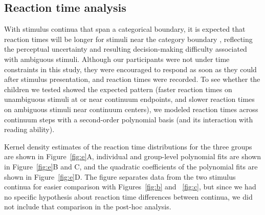 \documentclass[../uwthesis.tex]{subfiles}
\begin{document}
\subsection{Reaction time analysis}
With stimulus continua that span a categorical boundary, it is expected that reaction times will be longer for stimuli near the category boundary \cite{Pisoni1974ReactionCategories,Repp1981PerceptualStimuli}, reflecting the perceptual uncertainty and resulting decision-making difficulty associated with ambiguous stimuli. Although our participants were not under time constraints in this study, they were encouraged to respond as soon as they could after stimulus presentation, and reaction times were recorded. To see whether the children we tested showed the expected pattern (faster reaction times on unambiguous stimuli at or near continuum endpoints, and slower reaction times on ambiguous stimuli near continuum centers), we modeled reaction times across continuum steps with a second-order polynomial basis (and its interaction with reading ability).

Kernel density estimates of the reaction time distributions for the three groups are shown in Figure~\ref{fig:e}A, individual and group-level polynomial fits are shown in Figure~\ref{fig:e}B and C, and the quadratic coefficients of the polynomial fits are shown in Figure~\ref{fig:e}D. The figure separates data from the two stimulus continua for easier comparison with Figures~\ref{fig:b} and ~\ref{fig:c}, but since we had no specific hypothesis about reaction time differences between continua, we did not include that comparison in the post-hoc analysis.
\end{document}
